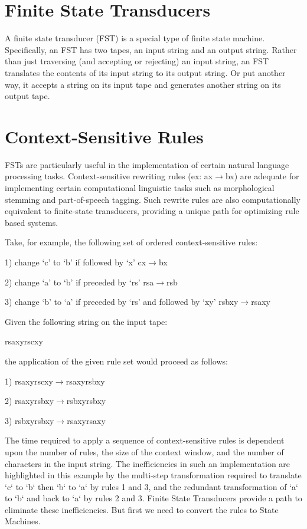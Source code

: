 \section{Finite State Transducers}
A finite state transducer (FST) is a special type of finite state machine. Specifically, an FST has two tapes, an input string and an output string. Rather than just traversing (and accepting or rejecting) an input string, an FST translates the contents of its input string to its output string. Or put another way, it accepts a string on its input tape and generates another string on its output tape.
\section{Context-Sensitive Rules}
FSTs are particularly useful in the implementation of certain natural language processing tasks. Context-sensitive rewriting rules (ex: ax$\rightarrow$bx) are adequate for implementing certain computational linguistic tasks such as morphological stemming and part-of-speech tagging. Such rewrite rules are also computationally equivalent to finite-state transducers, providing a unique path for optimizing rule based systems.

Take, for example, the following set of ordered context-sensitive rules:

1) 	change ‘c’ to ‘b’ if followed by ‘x’ 	   cx$\rightarrow$bx

2) 	change ‘a’ to ‘b’ if preceded by ‘rs’ 	   rsa$\rightarrow$rsb

3) 	change ‘b’ to ‘a’ if preceded by ‘rs’ and followed by ‘xy’ rsbxy$\rightarrow$rsaxy

Given the following string on the input tape:

rsaxyrscxy

the application of the given rule set would proceed as follows:

1) rsaxyrscxy$\rightarrow$rsaxyrsbxy

2) rsaxyrsbxy$\rightarrow$rsbxyrsbxy

3) rsbxyrsbxy$\rightarrow$rsaxyrsaxy

The time required to apply a sequence of context-sensitive rules is dependent upon the number of rules, the size of the context window, and the number of characters in the input string. The inefficiencies  in such an implementation are highlighted in this example by the multi-step transformation required to translate ‘c‘ to ‘b‘ then ‘b‘ to ‘a‘ by rules 1 and 3, and the redundant transformation of ‘a‘ to ‘b‘ and back to ‘a‘ by rules 2 and 3. Finite State Transducers provide a path to eliminate these inefficiencies. But first we need to convert the rules to State Machines.
